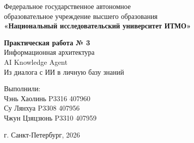 \begin{titlepage}
    \centering
    Федеральное государственное автономное\\
    образовательное учреждение высшего образования\\
    \textbf{«Национальный исследовательский университет ИТМО»}\\

    \vfill

    \textbf{Практическая работа № 3}\\
    \vspace{0.5\baselineskip}
    Информационная архитектура\\
    \vspace{0.5\baselineskip}
    AI Knowledge Agent\\
    \vspace{0.5\baselineskip}
    Из диалога с ИИ в личную базу знаний

    \vfill

    \begin{flushright}
    Выполнили:\\
    Чэнь Хаолинь P3316 407960\\
    Су Лянхуа P3308 407956\\
    Чжун Цзяцзюнь P3310 407959
    \end{flushright}

    \vspace{4\baselineskip}
    \centering
    г. Санкт-Петербург, 2026
\end{titlepage}
